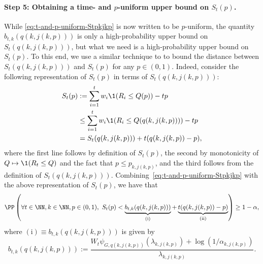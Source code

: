     \paragraph{Step 5: Obtaining a time- and $p$-uniform upper bound on $S_t(p)$.}
    While \eqref{eq:t-and-p-uniform-Stpkjkp} is now written to be $p$-uniform, the quantity $b_{t,k}(q(k,j(k,p)))$ is only a high-probability upper bound on $S_t(q(k,j(k,p)))$, but what we need is a high-probability upper bound on $S_t(p)$. To this end, we use a similar technique to \citet{howard2022sequential} to bound the distance between $S_t(q(k,j(k,p)))$ and $S_t(p)$ for any $p \in (0, 1)$. Indeed, consider the following representation of $S_t(p)$ in terms of $S_t(q(k,j(k,p)))$:
    \begin{align*}
      S_t(p) &:= \sum_{i=1}^t w_i \1(R_i \leq Q(p)) - tp \\
             &\leq \sum_{i=1}^t w_i \1(R_i \leq Q(q(k,j(k,p)))) - tp\\
             &= S_t(q(k,j(k,p))) + t(q(k,j(k,p))-p),
    \end{align*}
    where the first line follows by definition of $S_t(p)$, the second by monotonicity of $Q \mapsto \1(R_t \leq Q)$ and the fact that $p \leq p_{k, j(k,p)}$, and the third follows from the definition of $S_t(q(k,j(k,p)))$. Combining~\eqref{eq:t-and-p-uniform-Stpkjkp} with the above representation of $S_t(p)$, we have that
    \begin{equation}
      \label{eq:upper-bound-on-S_t_p-forall-k}
      \PP \left ( \forall t \in \NN, k \in \NN, p \in (0, 1),\ S_t(p) < \underbrace{b_{t,k} (q(k,j(k,p)))}_{\mathrm{(i)}} + \underbrace{t(q(k,j(k,p)) - p)}_{\mathrm{(ii)}} \right ) \geq 1-\alpha,
    \end{equation}
    where $\mathrm{(i)} \equiv b_{t,k}(q(k,j(k,p)))$ is given by
    \begin{equation}
      b_{t,k} (q(k,j(k,p))) := \frac{W_t\psi_{G, q(k,j(k,p))}(\lambda_{k,j(k,p)}) + \log(1/\alpha_{k,j(k,p)})}{\lambda_{k,j(k,p)}}.
    \end{equation}


